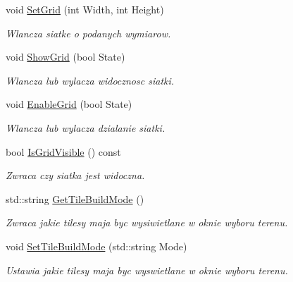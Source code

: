 \begin{DoxyCompactItemize}
\mbox{\label{classtfp_1_1_interface_a2651a9cd58974dd5b1bcaa67f8053383}} 
void \mbox{\hyperlink{classtfp_1_1_interface_a2651a9cd58974dd5b1bcaa67f8053383}{Set\+Grid}} (int Width, int Height)
\begin{DoxyCompactList}\small\item\em Wlancza siatke o podanych wymiarow. \end{DoxyCompactList}\item 
\mbox{\label{classtfp_1_1_interface_ad9c8c5694a92d3231a908b0ca1cfca0a}} 
void \mbox{\hyperlink{classtfp_1_1_interface_ad9c8c5694a92d3231a908b0ca1cfca0a}{Show\+Grid}} (bool State)
\begin{DoxyCompactList}\small\item\em Wlancza lub wylacza widocznosc siatki. \end{DoxyCompactList}\item 
\mbox{\label{classtfp_1_1_interface_af60c5483d296abcd46189599c168c985}} 
void \mbox{\hyperlink{classtfp_1_1_interface_af60c5483d296abcd46189599c168c985}{Enable\+Grid}} (bool State)
\begin{DoxyCompactList}\small\item\em Wlancza lub wylacza dzialanie siatki. \end{DoxyCompactList}\item 
\mbox{\label{classtfp_1_1_interface_ac43565d0cb0f9299b5109836a10cb4e5}} 
bool \mbox{\hyperlink{classtfp_1_1_interface_ac43565d0cb0f9299b5109836a10cb4e5}{Is\+Grid\+Visible}} () const
\begin{DoxyCompactList}\small\item\em Zwraca czy siatka jest widoczna. \end{DoxyCompactList}\item 
\mbox{\label{classtfp_1_1_interface_a11245e248584d6adda5d876a48bf89a3}} 
std\+::string \mbox{\hyperlink{classtfp_1_1_interface_a11245e248584d6adda5d876a48bf89a3}{Get\+Tile\+Build\+Mode}} ()
\begin{DoxyCompactList}\small\item\em Zwraca jakie tilesy maja byc wysiwietlane w oknie wyboru terenu. \end{DoxyCompactList}\item 
\mbox{\label{classtfp_1_1_interface_a798b5e201fc14d29e1f74f77bbd45c9c}} 
void \mbox{\hyperlink{classtfp_1_1_interface_a798b5e201fc14d29e1f74f77bbd45c9c}{Set\+Tile\+Build\+Mode}} (std\+::string Mode)
\begin{DoxyCompactList}\small\item\em Ustawia jakie tilesy maja byc wyswietlane w oknie wyboru terenu. \end{DoxyCompactList}\end{DoxyCompactItemize}
